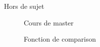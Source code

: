 \documentclass[10pt]{beamer}
\begin{document}
\begin{frame}{Hors de sujet}
    \begin{figure}[h]
        \centering
        \caption{Cours de master}
    \end{figure}
    \begin{figure}[h]
        \centering
        \caption{Fonction de comparison}
    \end{figure}
\end{frame}
\end{document}
